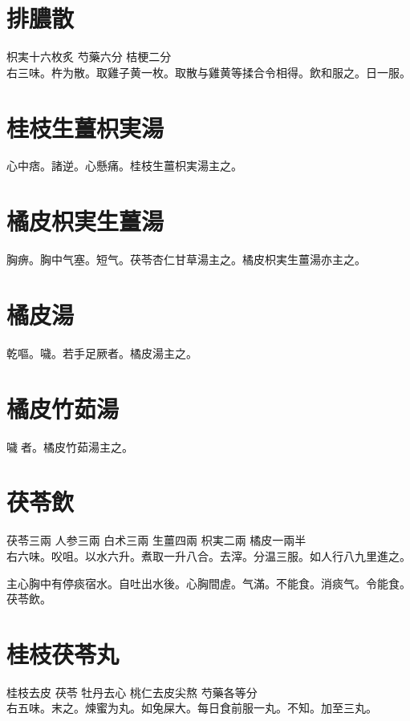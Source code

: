 \section{排膿散}

枳実{\scriptsize 十六枚炙} 芍藥{\scriptsize 六分} 桔梗{\scriptsize 二分}\\
右三味。杵为散。取雞子黄一枚。取散与雞黄等揉合令相得。飲和服之。日一服。

\section{桂枝生薑枳実湯}

心中痞。諸逆。心懸痛。桂枝生薑枳実湯主之。

\section{橘皮枳実生薑湯}

胸痹。胸中气塞。短气。茯苓杏仁甘草湯主之。橘{\khaaitp 皮}枳{\khaaitp 実生}薑湯亦主之。

\section{橘皮湯}

乾嘔。噦。若手足厥者。橘皮湯主之。

\section{橘皮竹茹湯}

噦{\sungtpii 𠱘}者。橘皮竹茹湯主之。

\section{茯苓飲}

茯苓{\scriptsize 三兩} 人参{\scriptsize 三兩} 白术{\scriptsize 三兩} 生薑{\scriptsize 四兩} 枳実{\scriptsize 二兩} 橘皮{\scriptsize 一兩半}\\
右六味。㕮咀。以水六升。煮取一升八合。去滓。分温三服。如人行八九里進之。

主心胸中有停痰宿水。自吐出水後。心胸間虗。气滿。不能食。消痰气。令能食。茯苓飲。

\section{桂枝茯苓丸}

桂枝{\scriptsize 去皮} 茯苓 牡丹{\scriptsize 去心} 桃仁{\scriptsize 去皮尖熬} 芍藥{\scriptsize 各等分}\\
右五味。末之。煉蜜为丸。如兔屎大。每日{\khaaitp 食前服}一丸。不知。加至三丸。

